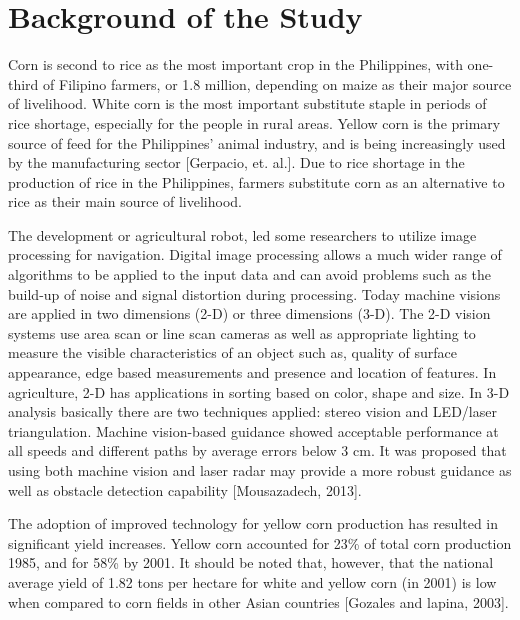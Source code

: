 \section{Background of the Study}

Corn is second to rice as the most important crop in the Philippines, with one-third of Filipino farmers, or 1.8 million, depending on maize as their major source of livelihood. White corn is the most important substitute staple in periods of rice shortage, especially for the people in rural areas. Yellow corn is the primary source of feed for the Philippines’ animal industry, and is being increasingly used by the manufacturing sector [Gerpacio, et. al.]. Due to rice shortage in the production of rice in the Philippines, farmers substitute corn as an alternative to rice as their main source of livelihood.
	
The development or agricultural robot, led some researchers to utilize image processing for navigation. Digital image processing allows a much wider range of algorithms to be applied to the input data and can avoid problems such as the build-up of noise and signal distortion during processing. Today machine visions are applied in two dimensions (2-D) or three dimensions (3-D). The 2-D vision systems use area scan or line scan cameras as well as appropriate lighting to measure the visible characteristics of an object such as, quality of surface appearance, edge based measurements and presence and location of features. In agriculture, 2-D has applications in sorting based on color, shape and size. In 3-D analysis basically there are two techniques applied: stereo vision and LED/laser triangulation. Machine vision-based guidance showed acceptable performance at all speeds and different paths by average errors below 3 cm. It was proposed that using both machine vision and laser radar may provide a more robust guidance as well as obstacle detection capability [Mousazadech, 2013].

	The adoption of improved technology for yellow corn production has resulted in significant yield increases.  Yellow corn accounted for 23\% of total corn production 1985, and for 58\% by 2001. It should be noted that, however, that the national average yield of 1.82 tons per hectare for white and yellow corn (in 2001) is low when compared to corn fields in other Asian countries [Gozales and lapina, 2003].

